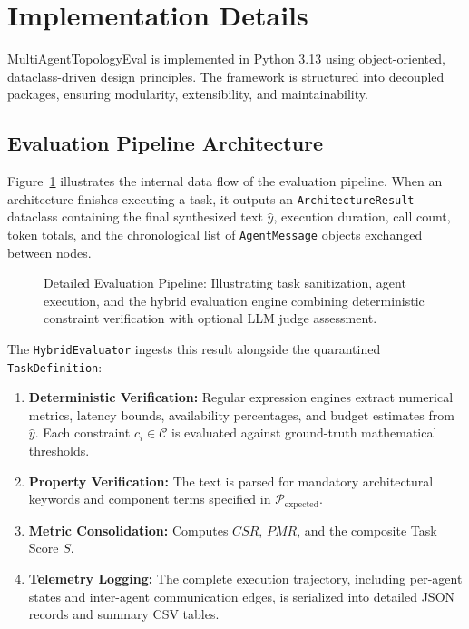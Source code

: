 \section{Implementation Details}
\label{sec:implementation}

MultiAgentTopologyEval is implemented in Python 3.13 using object-oriented, dataclass-driven design principles. The framework is structured into decoupled packages, ensuring modularity, extensibility, and maintainability.

\subsection{Evaluation Pipeline Architecture}
Figure~\ref{fig:evaluation_pipeline} illustrates the internal data flow of the evaluation pipeline. When an architecture finishes executing a task, it outputs an \texttt{ArchitectureResult} dataclass containing the final synthesized text $\hat{y}$, execution duration, call count, token totals, and the chronological list of \texttt{AgentMessage} objects exchanged between nodes.

\begin{figure}[h]
\centering

\caption{Detailed Evaluation Pipeline: Illustrating task sanitization, agent execution, and the hybrid evaluation engine combining deterministic constraint verification with optional LLM judge assessment.}
\label{fig:evaluation_pipeline}
\end{figure}

The \texttt{HybridEvaluator} ingests this result alongside the quarantined \texttt{TaskDefinition}:
\begin{enumerate}
    \item \textbf{Deterministic Verification:} Regular expression engines extract numerical metrics, latency bounds, availability percentages, and budget estimates from $\hat{y}$. Each constraint $c_i \in \mathcal{C}$ is evaluated against ground-truth mathematical thresholds.
    \item \textbf{Property Verification:} The text is parsed for mandatory architectural keywords and component terms specified in $\mathcal{P}_{\text{expected}}$.
    \item \textbf{Metric Consolidation:} Computes $CSR$, $PMR$, and the composite Task Score $S$.
    \item \textbf{Telemetry Logging:} The complete execution trajectory, including per-agent states and inter-agent communication edges, is serialized into detailed JSON records and summary CSV tables.
\end{enumerate}

